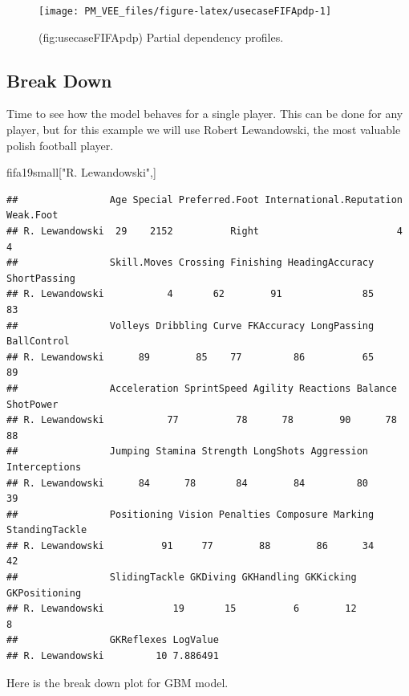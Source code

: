 \documentclass[12pt,]{krantz}
\newenvironment{Shaded}{\begin{snugshade}}{\end{snugshade}}
\newcommand{\NormalTok}[1]{#1}
\newcommand{\StringTok}[1]{\textcolor[rgb]{0.31,0.60,0.02}{#1}}
\begin{document}
\begin{figure}

{\centering \texttt{[image: PM\_VEE\_files/figure-latex/usecaseFIFApdp-1]} 

}

\caption{(fig:usecaseFIFApdp) Partial dependency profiles.}\label{fig:usecaseFIFApdp}
\end{figure}

\hypertarget{break-down}{%
\subsection{Break Down}\label{break-down}}

Time to see how the model behaves for a single player.
This can be done for any player, but for this example we will use Robert Lewandowski, the most valuable polish football player.

\begin{Shaded}
\begin{Highlighting}[]
\NormalTok{fifa19small[}\StringTok{"R. Lewandowski"}\NormalTok{,]}
\end{Highlighting}
\end{Shaded}

\begin{verbatim}
##                Age Special Preferred.Foot International.Reputation Weak.Foot
## R. Lewandowski  29    2152          Right                        4         4
##                Skill.Moves Crossing Finishing HeadingAccuracy ShortPassing
## R. Lewandowski           4       62        91              85           83
##                Volleys Dribbling Curve FKAccuracy LongPassing BallControl
## R. Lewandowski      89        85    77         86          65          89
##                Acceleration SprintSpeed Agility Reactions Balance ShotPower
## R. Lewandowski           77          78      78        90      78        88
##                Jumping Stamina Strength LongShots Aggression Interceptions
## R. Lewandowski      84      78       84        84         80            39
##                Positioning Vision Penalties Composure Marking StandingTackle
## R. Lewandowski          91     77        88        86      34             42
##                SlidingTackle GKDiving GKHandling GKKicking GKPositioning
## R. Lewandowski            19       15          6        12             8
##                GKReflexes LogValue
## R. Lewandowski         10 7.886491
\end{verbatim}

Here is the break down plot for GBM model.
\end{document}
